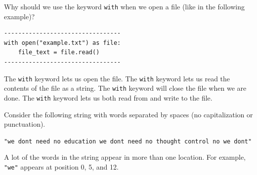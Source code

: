 \documentclass[12pt]{exam}
\begin{document}
\begin{questions}

\question[4] Why should we use the keyword \verb|with| when we open a file (like in the following example)?
\begin{verbatim}
---------------------------------
with open("example.txt") as file:
    file_text = file.read()
---------------------------------
\end{verbatim}

\begin{choices}
\choice The \verb|with| keyword lets us open the file. 
\choice The \verb|with| keyword lets us read the contents of the file as a string.
\choice The \verb|with| keyword will close the file when we are done.
\choice The \verb|with| keyword lets us both read from and write to the file. 
\end{choices}
\vfill


\newpage

\question[20] Consider the following string with words separated by spaces (no capitalization or punctuation).  
\begin{center}
\verb|"we dont need no education we dont need no thought control no we dont"|
\end{center}
A lot of the words in the string appear in more than one location.  For example, \verb|"we"| appears at position 0, 5, and 12.  
\end{questions}
\end{document}
